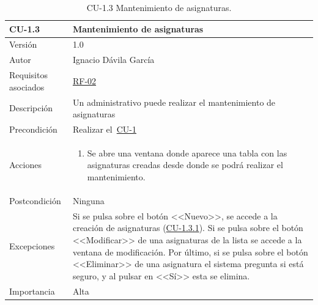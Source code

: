 \begin{table}[p]
	\centering
	\begin{tabularx}{\linewidth}{ p{} p{} }
		\toprule
		\textbf{CU-1.3}    & \textbf{Mantenimiento de asignaturas}\\
		\toprule
		{\small Versión}              & 1.0    \\
		{\small Autor}                & Ignacio Dávila García \\
		{\small Requisitos asociados} & \hyperref[itm:RF2]{RF-02} \\
		{\small Descripción}          & Un administrativo puede realizar el mantenimiento de asignaturas \\
		{\small Precondición}         & Realizar el~\hyperref[table:CU-1]{CU-1} \\
		{\small Acciones}             &
		\begin{enumerate}
			\def\labelenumi{\arabic{enumi}.}
			\tightlist
			\item Se abre una ventana donde aparece una tabla con las asignaturas creadas desde donde se podrá realizar el mantenimiento.
		\end{enumerate}\\
		{\small Postcondición}        & Ninguna \\
		{\small Excepciones}          & Si se pulsa sobre el botón <<Nuevo>>, se accede a la creación de asignaturas (\hyperref[table:CU-1_3_1]{CU-1.3.1}). Si se pulsa sobre el botón <<Modificar>> de una asignaturas de la lista se accede a la ventana de modificación. Por último, si se pulsa sobre el botón <<Eliminar>> de una asignatura el sistema pregunta si está seguro, y al pulsar en <<Sí>> esta se elimina. \\
		{\small Importancia}          & Alta \\
		\bottomrule
	\end{tabularx}
	\caption{CU-1.3 Mantenimiento de asignaturas.}\label{table:CU-1_3}
\end{table}
\FloatBarrier

